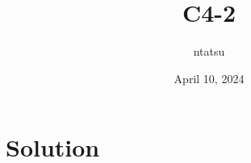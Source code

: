 \documentclass{article}
\title{C4-2}
\author{ntatsu}
\date{April 10, 2024}
\theoremstyle{definition}
\theoremstyle{remark}
\begin{document}
\maketitle

\section{Solution}

\end{document}
